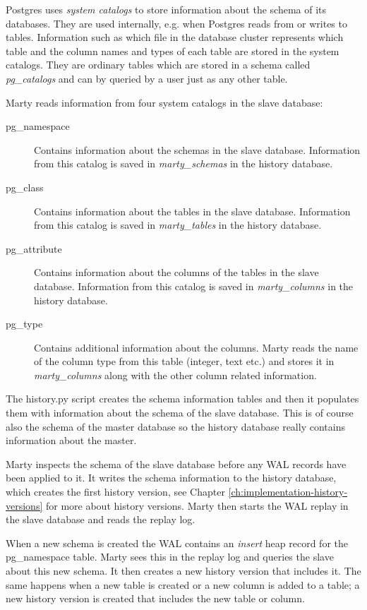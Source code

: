 Postgres uses \textit{system catalogs} to store information about the schema of its databases.
They are used internally, e.g. when Postgres reads from or writes to tables.
Information such as which file in the database cluster represents which table and the column names and types of each table are stored in the system catalogs.
They are ordinary tables which are stored in a schema called \textit{pg\_catalogs} and can by queried by a user just as any other table.

Marty reads information from four system catalogs in the slave database:

\begin{description}
  \item[pg\_namespace]
    Contains information about the schemas in the slave database.
    Information from this catalog is saved in \textit{marty\_schemas} in the history database.
  \item[pg\_class]
    Contains information about the tables in the slave database.
    Information from this catalog is saved in \textit{marty\_tables} in the history database.
  \item[pg\_attribute]
    Contains information about the columns of the tables in the slave database.
    Information from this catalog is saved in \textit{marty\_columns} in the history database.
  \item[pg\_type]
    Contains additional information about the columns.
    Marty reads the name of the column type from this table (integer, text etc.) and stores it in \textit{marty\_columns} along with the other column related information.
\end{description}

The history.py script creates the schema information tables and then it populates them with information about the schema of the slave database.
This is of course also the schema of the master database so the history database really contains information about the master.

Marty inspects the schema of the slave database before any WAL records have been applied to it.
It writes the schema information to the history database, which creates the first history version, see Chapter \ref{ch:implementation-history-versions} for more about history versions.
Marty then starts the WAL replay in the slave database and reads the replay log.

When a new schema is created the WAL contains an \textit{insert} heap record for the pg\_namespace table.
Marty sees this in the replay log and queries the slave about this new schema.
It then creates a new history version that includes it.
The same happens when a new table is created or a new column is added to a table; a new history version is created that includes the new table or column.

